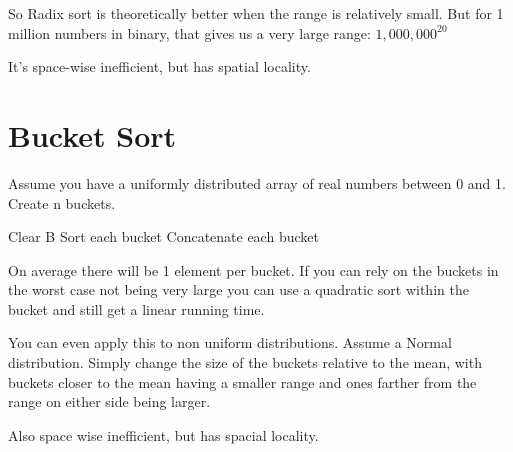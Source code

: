 \documentclass[english, 10pt]{article}
\begin{document}
So Radix sort is theoretically better when the range is relatively small. But
for 1 million numbers in binary, that gives us a very large range:
$1,000,000^{20}$

It's space-wise inefficient, but has spatial locality.

\section{Bucket Sort}

Assume you have a uniformly distributed array of real numbers between 0 and 1.
Create n buckets.

\begin{algorithm}
    Clear B\;
    Sort each bucket\;
    Concatenate each bucket\;
\end{algorithm}

On average there will be 1 element per bucket. If you can rely on the buckets
in the worst case not being very large you can use a quadratic sort within the
bucket and still get a linear running time.

You can even apply this to non uniform distributions. Assume a Normal
distribution. Simply change the size of the buckets relative to the mean, with
buckets closer to the mean having a smaller range and ones farther from the
range on either side being larger.

Also space wise inefficient, but has spacial locality.


\end{document}
